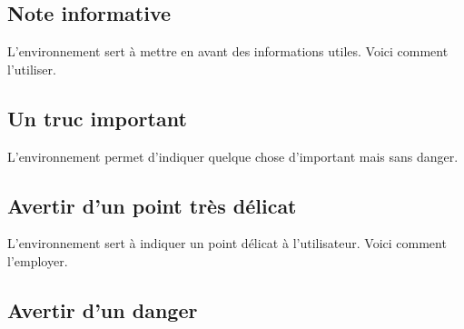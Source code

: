 
\subsection{Note informative}

L'environnement  sert à mettre en avant des informations utiles. Voici comment l'utiliser.




\subsection{Un truc important}

L'environnement  permet d'indiquer quelque chose d'important mais sans danger.




\subsection{Avertir d'un point très délicat}

L'environnement  sert à indiquer un point délicat à  l'utilisateur. Voici comment l'employer.




\subsection{Avertir d'un danger}

